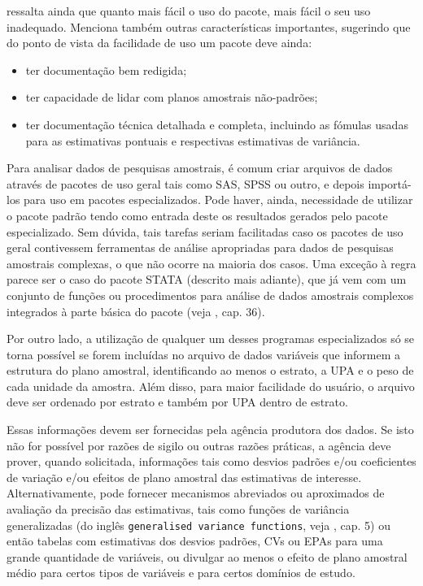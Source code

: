 \documentclass[]{book}
\theoremstyle{definition}
\theoremstyle{definition}
\theoremstyle{definition}
\theoremstyle{remark}
\begin{document}
\citep{carlson} ressalta ainda que quanto mais fácil o uso do pacote,
mais fácil o seu uso inadequado. Menciona também outras características
importantes, sugerindo que do ponto de vista da facilidade de uso um
pacote deve ainda:

\begin{itemize}
\item
  ter documentação bem redigida;
\item
  ter capacidade de lidar com planos amostrais não-padrões;
\item
  ter documentação técnica detalhada e completa, incluindo as fómulas
  usadas para as estimativas pontuais e respectivas estimativas de
  variância.
\end{itemize}

Para analisar dados de pesquisas amostrais, é comum criar arquivos de
dados através de pacotes de uso geral tais como SAS, SPSS ou outro, e
depois importá-los para uso em pacotes especializados. Pode haver,
ainda, necessidade de utilizar o pacote padrão tendo como entrada deste
os resultados gerados pelo pacote especializado. Sem dúvida, tais
tarefas seriam facilitadas caso os pacotes de uso geral contivessem
ferramentas de análise apropriadas para dados de pesquisas amostrais
complexas, o que não ocorre na maioria dos casos. Uma exceção à regra
parece ser o caso do pacote STATA (descrito mais adiante), que já vem
com um conjunto de funções ou procedimentos para análise de dados
amostrais complexos integrados à parte básica do pacote (veja
\citep{Stata}, cap. 36).

Por outro lado, a utilização de qualquer um desses programas
especializados só se torna possível se forem incluídas no arquivo de
dados variáveis que informem a estrutura do plano amostral,
identificando ao menos o estrato, a UPA e o peso de cada unidade da
amostra. Além disso, para maior facilidade do usuário, o arquivo deve
ser ordenado por estrato e também por UPA dentro de estrato.

Essas informações devem ser fornecidas pela agência produtora dos dados.
Se isto não for possível por razões de sigilo ou outras razões práticas,
a agência deve prover, quando solicitada, informações tais como desvios
padrões e/ou coeficientes de variação e/ou efeitos de plano amostral das
estimativas de interesse. Alternativamente, pode fornecer mecanismos
abreviados ou aproximados de avaliação da precisão das estimativas, tais
como funções de variância generalizadas (do inglês
\texttt{generalised\ variance\ functions}, veja \citep{W85}, cap. 5) ou
então tabelas com estimativas dos desvios padrões, CVs ou EPAs para uma
grande quantidade de variáveis, ou divulgar ao menos o efeito de plano
amostral médio para certos tipos de variáveis e para certos domínios de
estudo.
\end{document}
